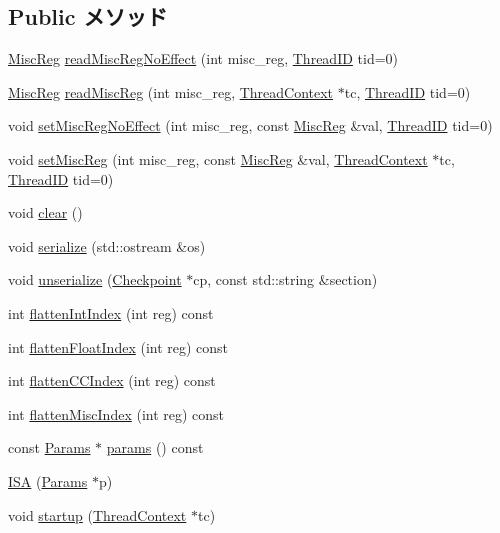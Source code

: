 \subsection*{Public メソッド}
\begin{DoxyCompactItemize}
\item 
\hyperlink{namespaceAlphaISA_aa16539aa6584fd12f7d6fa868f75b4de}{MiscReg} \hyperlink{classAlphaISA_1_1ISA_af2ec8925148a53b9bddefb7fb65a7223}{readMiscRegNoEffect} (int misc\_\-reg, \hyperlink{base_2types_8hh_ab39b1a4f9dad884694c7a74ed69e6a6b}{ThreadID} tid=0)
\item 
\hyperlink{namespaceAlphaISA_aa16539aa6584fd12f7d6fa868f75b4de}{MiscReg} \hyperlink{classAlphaISA_1_1ISA_a81ac5a0c0d9b625997d7737f911743b1}{readMiscReg} (int misc\_\-reg, \hyperlink{classThreadContext}{ThreadContext} $\ast$tc, \hyperlink{base_2types_8hh_ab39b1a4f9dad884694c7a74ed69e6a6b}{ThreadID} tid=0)
\item 
void \hyperlink{classAlphaISA_1_1ISA_ab8dd4afdd4e652ca191b235505691f68}{setMiscRegNoEffect} (int misc\_\-reg, const \hyperlink{namespaceAlphaISA_aa16539aa6584fd12f7d6fa868f75b4de}{MiscReg} \&val, \hyperlink{base_2types_8hh_ab39b1a4f9dad884694c7a74ed69e6a6b}{ThreadID} tid=0)
\item 
void \hyperlink{classAlphaISA_1_1ISA_ab85b054f14d72781b7f540270867e2df}{setMiscReg} (int misc\_\-reg, const \hyperlink{namespaceAlphaISA_aa16539aa6584fd12f7d6fa868f75b4de}{MiscReg} \&val, \hyperlink{classThreadContext}{ThreadContext} $\ast$tc, \hyperlink{base_2types_8hh_ab39b1a4f9dad884694c7a74ed69e6a6b}{ThreadID} tid=0)
\item 
void \hyperlink{classAlphaISA_1_1ISA_ac8bb3912a3ce86b15842e79d0b421204}{clear} ()
\item 
void \hyperlink{classAlphaISA_1_1ISA_a53e036786d17361be4c7320d39c99b84}{serialize} (std::ostream \&os)
\item 
void \hyperlink{classAlphaISA_1_1ISA_af22e5d6d660b97db37003ac61ac4ee49}{unserialize} (\hyperlink{classCheckpoint}{Checkpoint} $\ast$cp, const std::string \&section)
\item 
int \hyperlink{classAlphaISA_1_1ISA_aece4b88ffcab608652e8e9f0fbe643d4}{flattenIntIndex} (int reg) const 
\item 
int \hyperlink{classAlphaISA_1_1ISA_a85addcd4f57c5a0ffa81805dcad1eeb7}{flattenFloatIndex} (int reg) const 
\item 
int \hyperlink{classAlphaISA_1_1ISA_a7a5d7476bd10e5af09e6e753d1fca087}{flattenCCIndex} (int reg) const 
\item 
int \hyperlink{classAlphaISA_1_1ISA_a8997760aa4425793911f57440a4dd8ae}{flattenMiscIndex} (int reg) const 
\item 
const \hyperlink{classAlphaISA_1_1ISA_a492961bc1e489616b642e85a4e2ddf03}{Params} $\ast$ \hyperlink{classAlphaISA_1_1ISA_a0968f22111d8484ab76cc2d65d1ad57d}{params} () const 
\item 
\hyperlink{classAlphaISA_1_1ISA_ae9132e021b3f3b20c917fc328a056bbd}{ISA} (\hyperlink{classAlphaISA_1_1ISA_a492961bc1e489616b642e85a4e2ddf03}{Params} $\ast$p)
\item 
void \hyperlink{classAlphaISA_1_1ISA_a769e733729615c529fdb54f538f11dba}{startup} (\hyperlink{classThreadContext}{ThreadContext} $\ast$tc)
\end{DoxyCompactItemize}
